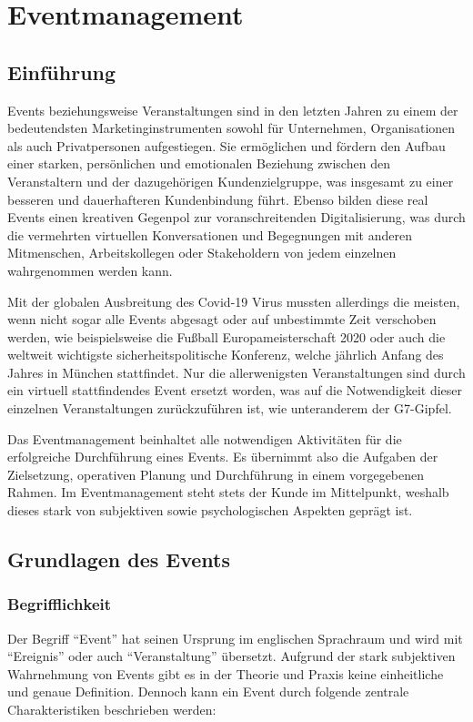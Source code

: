 \chapter{Eventmanagement}
\section{Einführung}
Events beziehungsweise Veranstaltungen sind in den letzten Jahren zu einem der bedeutendsten Marketinginstrumenten sowohl für Unternehmen, Organisationen als auch Privatpersonen aufgestiegen.
Sie ermöglichen und fördern den Aufbau einer starken, persönlichen und emotionalen Beziehung zwischen den Veranstaltern und der dazugehörigen Kundenzielgruppe, was insgesamt zu einer besseren und dauerhafteren Kundenbindung führt.
Ebenso bilden diese real Events einen kreativen Gegenpol zur voranschreitenden Digitalisierung, was durch die vermehrten virtuellen Konversationen und Begegnungen mit anderen Mitmenschen, Arbeitskollegen oder Stakeholdern von jedem einzelnen wahrgenommen werden kann.\autocite[Vgl.][]{Eventmanagementstudieren.de.o.J.}

Mit der globalen Ausbreitung des Covid-19 Virus mussten allerdings die meisten, wenn nicht sogar alle Events abgesagt oder auf unbestimmte Zeit verschoben werden, wie beispielsweise die Fußball Europameisterschaft 2020 oder auch die weltweit wichtigste sicherheitspolitische Konferenz, welche jährlich Anfang des Jahres in München stattfindet. 
Nur die allerwenigsten Veranstaltungen sind durch ein virtuell stattfindendes Event ersetzt worden, was auf die Notwendigkeit dieser einzelnen Veranstaltungen zurückzuführen ist, wie unteranderem der G7-Gipfel.\autocites[Vgl.][]{Tagesschau.o.J.}[Vgl.][]{Nahar.o.J.}

Das Eventmanagement beinhaltet alle notwendigen Aktivitäten für die erfolgreiche Durchführung eines Events.
Es übernimmt also die Aufgaben der Zielsetzung, operativen Planung und Durchführung in einem vorgegebenen Rahmen.
Im Eventmanagement steht stets der Kunde im Mittelpunkt, weshalb dieses stark von subjektiven sowie psychologischen Aspekten geprägt ist.\autocite[Vgl.][]{ZeitOnline.o.J.}

\section{Grundlagen des Events}
\subsection{Begrifflichkeit}
Der Begriff \enquote{Event} hat seinen Ursprung im englischen Sprachraum und wird mit \enquote{Ereignis} oder auch \enquote{Veranstaltung} übersetzt.
Aufgrund der stark subjektiven Wahrnehmung von Events gibt es in der Theorie und Praxis keine einheitliche und genaue Definition.
Dennoch kann ein Event durch folgende zentrale Charakteristiken beschrieben werden: 

